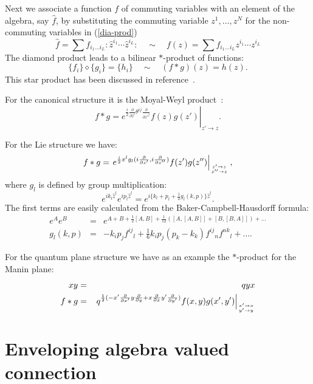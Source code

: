 \documentclass[a4paper,11pt]{article}
\newcommand{\newsection}{ \setcounter{equation}{0} \section}
\def\nn{\nonumber }
\def\z{\hat z}
\def\pat{\partial}
\begin{document}
Next we associate a function $f$ of commuting variables with 
an element of the algebra, say $\hat{f}$, by substituting 
the commuting variable $z^1,\ldots,z^N$ for the non-commuting variables
in (\ref{dia-prod}) 
\begin{equation}
  \hat{f}=\sum f_{i_1\ldots i_L}:\z^{i_1}\cdots\z^{i_L}:\quad\sim\quad f(z)=\sum f_{i_1\ldots i_L}z^{i_1}\cdots z^{i_L}
\end{equation}
The diamond product leads to a bilinear $*$-product of functions:
\begin{equation}
  \{f_i\}\diamond\{g_i\}=\{h_i\}\quad\sim\quad (f*g)(z)=h(z).
\end{equation}
This star product has been discussed in reference~\cite{MSSW}.

For the canonical structure it is the Moyal-Weyl
product~\cite{Weyl,Wigner,Moyal}: 
\begin{equation}
\label{MoWe-prod}
  f*g=\left.e^{\frac{i}{2}\frac{\pat}{\pat z^i}\theta^{ij}\frac{\pat}{\pat z'^j}}f(z)g(z')\right|_{z'\to z}.
\end{equation}

For the Lie structure we have:
\begin{equation}
  f*g=\left.e^{\frac{i}{2}x^lg_l(i\frac{\pat}{\pat z'},i\frac{\pat}{\pat z''})}f(z')g(z'')\right|_{z'\to z\atop z''\to z},
\end{equation}
where $g_l$ is defined by group multiplication:
\begin{equation}
  e^{ik_l\z^l}e^{ip_l\z^l}=e^{i\{k_l+p_l+\frac{1}{2}g_l(k,p)\}\z^l}.
\end{equation}
The first terms are easily calculated from the
Baker-Campbell-Hausdorff formula:
\begin{eqnarray}
\label{BCH}
  e^Ae^B&=&e^{A+B+\frac{1}{2}[A,B]+\frac{1}{12}([A,[A,B]]+[B,[B,A]])+\ldots}\nn\\
  g_l(k,p)&=&-k_ip_jf^{ij}{}_l+\frac{1}{6}k_ip_j(p_k-k_k)f^{ij}{}_nf^{nk}{}_l+\ldots.
\end{eqnarray}

For the quantum plane structure we have as an example the $*$-product for the 
Manin plane:
\begin{eqnarray}
  xy&=&qyx\nn\\
  f*g &=& \left. q^{\frac{1}{2}(-x'\frac{\pat}{\pat x'}y
\frac{\pat}{\pat y}+x\frac{\pat}{\pat x}y'\frac{\pat}{\pat y'})}f(x,y)g(x',y')
\right|_{x'\to x \atop y'\to y}
\end{eqnarray}


\newsection{Enveloping algebra valued connection}
\end{document}
